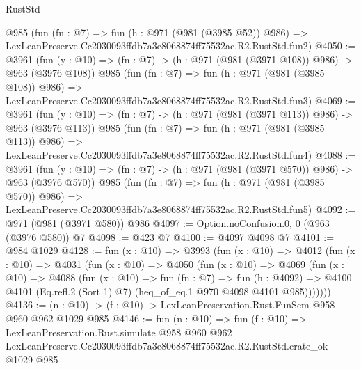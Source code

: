 \begin{lexlean}{RustStd}
\begin{coremodule}
    @985
    (fun (fn : @7) =>
    fun (h : @971 (@981 (@3985 @52)) @986) =>
    LexLeanPreserve.Cc2030093ffdb7a3e8068874ff75532ac.R2.RustStd.fun2)
@4050 := @3961
    (fun (y : @10) => (fn : @7) -> (h : @971 (@981 (@3971 @108)) @986) -> @963 (@3976 @108))
    @985
    (fun (fn : @7) =>
    fun (h : @971 (@981 (@3985 @108)) @986) =>
    LexLeanPreserve.Cc2030093ffdb7a3e8068874ff75532ac.R2.RustStd.fun3)
@4069 := @3961
    (fun (y : @10) => (fn : @7) -> (h : @971 (@981 (@3971 @113)) @986) -> @963 (@3976 @113))
    @985
    (fun (fn : @7) =>
    fun (h : @971 (@981 (@3985 @113)) @986) =>
    LexLeanPreserve.Cc2030093ffdb7a3e8068874ff75532ac.R2.RustStd.fun4)
@4088 := @3961
    (fun (y : @10) => (fn : @7) -> (h : @971 (@981 (@3971 @570)) @986) -> @963 (@3976 @570))
    @985
    (fun (fn : @7) =>
    fun (h : @971 (@981 (@3985 @570)) @986) =>
    LexLeanPreserve.Cc2030093ffdb7a3e8068874ff75532ac.R2.RustStd.fun5)
@4092 := @971 (@981 (@3971 @580)) @986
@4097 := Option.noConfusion.{0, 0} (@963 (@3976 @580)) @7
@4098 := @423 @7
@4100 := @4097 @4098 @7
@4101 := @984 @1029
@4128 := fun (x : @10) =>
  @3993
    (fun (x : @10) =>
    @4012
      (fun (x : @10) =>
      @4031
        (fun (x : @10) =>
        @4050
          (fun (x : @10) =>
          @4069
            (fun (x : @10) =>
            @4088
              (fun (x : @10) =>
              fun (fn : @7) =>
              fun (h : @4092) =>
              @4100 @4101 (Eq.refl.{2} (Sort 1) @7) (heq_of_eq.{1} @970 @4098 @4101 @985)))))))
@4136 := (n : @10) -> (f : @10) -> LexLeanPreservation.Rust.FunSem @958 @960 @962 @1029 @985
@4146 := fun (n : @10) =>
  fun (f : @10) =>
  LexLeanPreservation.Rust.simulate
    @958
    @960
    @962
    LexLeanPreserve.Cc2030093ffdb7a3e8068874ff75532ac.R2.RustStd.crate_ok
    @1029
    @985
\end{coremodule}
\end{lexlean}
